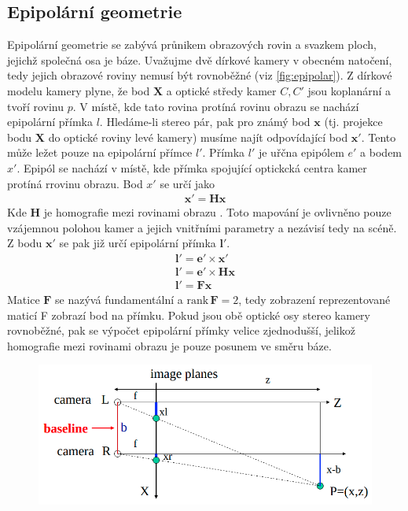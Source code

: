 \documentclass[twoside]{ctuthesis}
\newcommand{\tl}[1]{$\mathbf{#1}$}
\begin{document}
\subsection{Epipolární geometrie}
\label{Sec:epipolar}
Epipolární geometrie se zabývá průnikem obrazových rovin a svazkem ploch, jejichž společná osa je báze. Uvažujme dvě dírkové kamery v obecném natočení, tedy jejich obrazové roviny nemusí být rovnoběžné (viz \ref{fig:epipolar}). Z dírkové modelu kamery plyne, že bod \tl{X} a optické středy kamer $C, C'$ jsou koplanární a tvoří rovinu $p$. V místě, kde tato rovina protíná rovinu obrazu se nachází epipolární přímka $l$. Hledáme-li stereo pár, pak pro známý bod \tl{x} (tj. projekce bodu \tl{X} do optické roviny levé kamery) musíme najít odpovídající bod \tl{x'}. Tento může ležet pouze na epipolární přímce $l'$. Přímka $l'$ je uřčna epipólem $e'$ a bodem $x'$. Epipól se nachází v místě, kde přímka spojující optickcká centra kamer protíná rrovinu obrazu. Bod $x'$ se určí jako 
\begin{align}
    \mathbf{x'} = \mathbf{Hx}
\end{align}
Kde \tl{H} je homografie mezi rovinami obrazu . Toto mapování je ovlivněno pouze vzájemnou polohou kamer a jejich vnitřními parametry a nezávisí tedy na scéně.
Z bodu \tl{x'} se pak již určí epipolární přímka \tl{l'}.
\begin{align}
    \mathbf{l'} = \mathbf{e'} \times \mathbf{x'} \\
    \mathbf{l'} = \mathbf{e'} \times \mathbf{Hx} \\
    \mathbf{l'} = \mathbf{Fx} 
\end{align}    
Matice \tl{F} se nazývá fundamentální a $\text{rank}\,{\mathbf{F}} = 2$, tedy zobrazení reprezentované maticí F zobrazí bod na přímku.
    Pokud jsou obě optické osy stereo kamery rovnoběžné, pak se výpočet epipolární přímky velice zjednodušší, jelikož homografie mezi rovinami obrazu je pouze posunem ve směru báze.
\begin{figure}

    \centering
    \includegraphics[width = 0.8\linewidth]{pictures/stereo_sketch.png}
    \caption{\cite{washingtion_steropic}}
    \label{stereo_paralel}
\end{figure}
\end{document}
